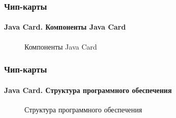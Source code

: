 \begin{frame}
    \frametitle{Чип-карты}
    \framesubtitle{Java Card. Компоненты Java Card}
    
    \begin{figure}
        \begin{center}
            \caption{Компоненты Java Card}\label{pict:jcardcomp}
        \end{center}
    \end{figure} 
    
\end{frame}


\begin{frame}
    \frametitle{Чип-карты}
    \framesubtitle{Java Card. Структура программного обеспечения}
    
    \begin{figure}
        \begin{center}
            \caption{Структура программного обеспечения}\label{pict:jcardsoft}
        \end{center}
    \end{figure} 
    
\end{frame}



